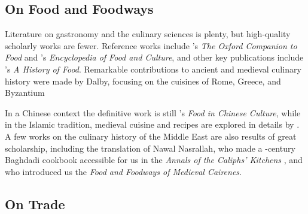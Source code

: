 










\subsection{On Food and Foodways}

Literature on gastronomy and the culinary sciences is plenty, but high-quality scholarly works are fewer. Reference works include \textcite{davidson_oxford_2014}'s \textit{The Oxford Companion to Food} and \textcite{katz_encyclopedia_2003}'s \textit{Encyclopedia of Food and Culture}, and other key publications include \textcite{toussaint-samat_history_2009}'s \textit{A History of Food}. Remarkable contributions to ancient and medieval culinary history were made by Dalby, focusing on the cuisines of Rome, Greece, and Byzantium \autocite{dalby_siren_1996,dalby_tastes_2010,dalby_classical_1996,dalby_food_2003} 

In a Chinese context the definitive work is still \textcite{chang_food_1977}'s \textit{Food in Chinese Culture}, while in the Islamic tradition, medieval cuisine and recipes are explored in details by \textcite{zaouali_medieval_2007}. A few works on the culinary history of the Middle East are also results of great scholarship, including the translation of Nawal Nasrallah, who made a -century Baghdadi cookbook accessible for us in the \textit{Annals of the Caliphs' Kitchens} \autocite{ibn_sayyar_al-warraq_annals_2007}, and \textcite{lewicka_food_2011} who introduced us the \textit{Food and Foodways of Medieval Cairenes}.

\subsection{On Trade}


